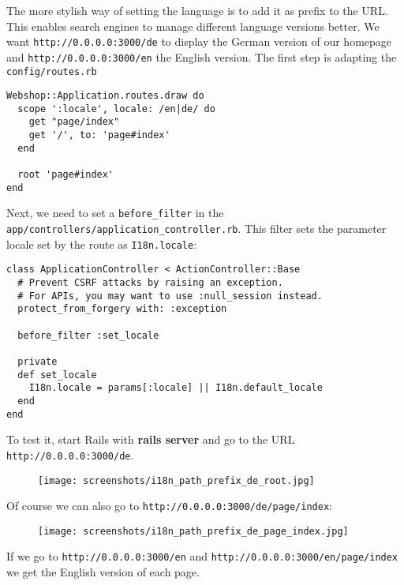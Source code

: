 \documentclass[a4paper]{book}
\begin{document}
The more stylish way of setting the language is to add it as prefix to the URL. This enables search engines to manage different language versions better. We want \texttt{http://0.0.0.0:3000/de} to display the German version of our homepage and \texttt{http://0.0.0.0:3000/en} the English version. The first step is adapting the \texttt{config/routes.rb}

\begin{shaded}\begin{verbatim}
Webshop::Application.routes.draw do
  scope ':locale', locale: /en|de/ do
    get "page/index"
    get '/', to: 'page#index'
  end

  root 'page#index'
end
\end{verbatim}\end{shaded}

Next, we need to set a \texttt{before\_filter} in the \texttt{app/controllers/application\_controller.rb}. This filter sets the parameter locale set by the route as \texttt{I18n.locale}:

\begin{shaded}\begin{verbatim}
class ApplicationController < ActionController::Base
  # Prevent CSRF attacks by raising an exception.
  # For APIs, you may want to use :null_session instead.
  protect_from_forgery with: :exception

  before_filter :set_locale

  private
  def set_locale
    I18n.locale = params[:locale] || I18n.default_locale
  end
end
\end{verbatim}\end{shaded}

To test it, start Rails with \textbf{rails server} and go to the URL \texttt{http://0.0.0.0:3000/de}.

\begin{figure}[htbp]
\centering
\texttt{[image: screenshots/i18n\_path\_prefix\_de\_root.jpg]}
\end{figure}

Of course we can also go to \texttt{http://0.0.0.0:3000/de/page/index}:

\begin{figure}[htbp]
\centering
\texttt{[image: screenshots/i18n\_path\_prefix\_de\_page\_index.jpg]}
\end{figure}

If we go to \texttt{http://0.0.0.0:3000/en} and \texttt{http://0.0.0.0:3000/en/page/index} we get the English version of each page.
\end{document}
